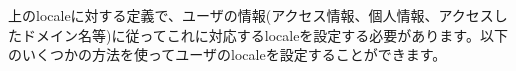 上のlocaleに対する定義で、ユーザの情報(アクセス情報、個人情報、アクセスしたドメイン名等)に従ってこれに対応するlocaleを設定する必要があります。以下のいくつかの方法を使ってユーザのlocaleを設定することができます。
